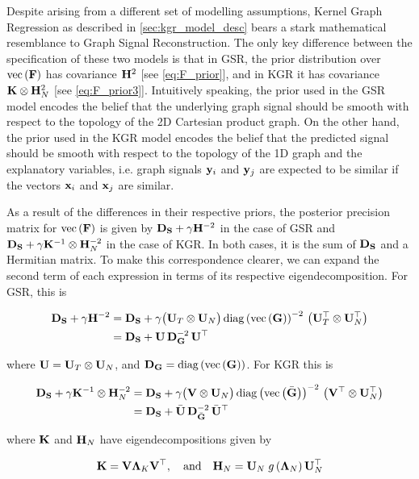 \label{sec:KGR_and_GSR}

Despite arising from a different set of modelling assumptions, Kernel Graph Regression as described in \cref{sec:kgr_model_desc} bears a stark mathematical resemblance to Graph Signal Reconstruction. The only key difference between the specification of these two models is that in GSR, the prior distribution over $\text{\textup{vec}}\left(\mathbf{F}\right)$ has covariance $\mathbf{H}^2$ [see \cref{eq:F_prior}], and in KGR it has covariance $\mathbf{K} \otimes \mathbf{H}_N^2$ [see \cref{eq:F_prior3}]. Intuitively speaking, the prior used in the GSR model encodes the belief that the underlying graph signal should be smooth with respect to the topology of the 2D Cartesian product graph. On the other hand, the prior used in the KGR model encodes the belief that the predicted signal should be smooth with respect to the topology of the 1D graph and the explanatory variables, i.e. graph signals $\mathbf{y}_i$ and $\mathbf{y}_j$ are expected to be similar if the vectors $\mathbf{x}_i$ and $\mathbf{x}_j$ are similar. 


As a result of the differences in their respective priors, the posterior precision matrix for $\text{\textup{vec}}\left(\mathbf{F}\right)$ is given by $\mathbf{D}_{\mathbf{S}} + \gamma \mathbf{H}^{-2}$ in the case of GSR and $\mathbf{D}_{\mathbf{S}} + \gamma \mathbf{K}^{-1} \otimes \mathbf{H}_N^{-2}$ in the case of KGR. In both cases, it is the sum of $\mathbf{D}_{\mathbf{S}}$ and a Hermitian matrix. To make this correspondence clearer, we can expand the second term of each expression in terms of its respective eigendecomposition. For GSR, this is

\begin{align*}
    \mathbf{D}_{\mathbf{S}} + \gamma \mathbf{H}^{-2} &= \mathbf{D}_{\mathbf{S}} + \gamma \big(\mathbf{U}_T \otimes \mathbf{U}_N \big) \, \text{\textup{diag}}\left(\text{\textup{vec}}\left(\mathbf{G}\right)\right)^{-2} \, \big(\mathbf{U}_T^\top \otimes \mathbf{U}_N^\top \big) \\
    &= \mathbf{D}_{\mathbf{S}} + \mathbf{U} \, \mathbf{D}_{\mathbf{G}}^{-2} \, \mathbf{U}^\top
\end{align*}

where $\mathbf{U} = \mathbf{U}_T \otimes \mathbf{U}_N $, and $\mathbf{D}_{\mathbf{G}} = \text{\textup{diag}}\left(\text{\textup{vec}}\left(\mathbf{G}\right)\right)$. For KGR this is

\begin{align*}
    \mathbf{D}_{\mathbf{S}} + \gamma \mathbf{K}^{-1} \otimes \mathbf{H}_N^{-2} &= \mathbf{D}_{\mathbf{S}} + \gamma \big(\mathbf{V} \otimes \mathbf{U}_N \big) \, \text{\textup{diag}}\left(\text{\textup{vec}}\left(\bar{\mathbf{G}}\right)\right)^{-2} \, \big(\mathbf{V}^\top \otimes \mathbf{U}_N^\top \big) \\
    &= \mathbf{D}_{\mathbf{S}} + \bar{\mathbf{U}} \, \mathbf{D}_{\bar{\mathbf{G}}}^{-2} \, \bar{\mathbf{U}}^\top
\end{align*}

where $\mathbf{K}$ and $\mathbf{H}_N$ have eigendecompositions given by 

\begin{equation}
    \mathbf{K} = \mathbf{V} \mathbf{\Lambda}_K \mathbf{V}^\top, \quad \text{and} \quad \mathbf{H}_N = \mathbf{U}_N \; g\left(\mathbf{\Lambda}_N\right)  \mathbf{U}_N^\top
\end{equation}

